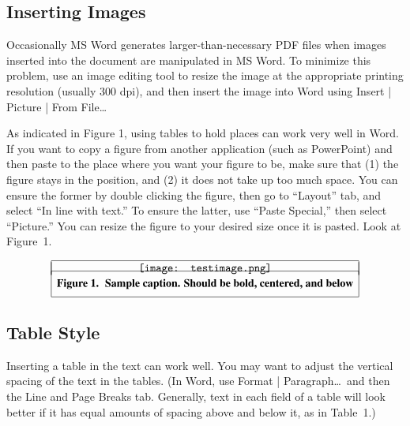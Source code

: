 \documentclass{icis}
\begin{document}
\subsection{Inserting Images}
Occasionally MS Word generates larger-than-necessary PDF files when images
inserted into the document are manipulated in MS Word. To minimize this
problem, use an image editing tool to resize the image at the appropriate
printing resolution (usually 300 dpi), and then insert the image into Word using
Insert | Picture | From File\ldots

As indicated in Figure 1, using tables to hold places can work very well in
Word. If you want to copy a figure from another application (such as PowerPoint)
and then paste to the place where you want your figure to be, make sure that (1)
the figure stays in the position, and (2) it does not take up too much
space. You can ensure the former by double clicking the figure, then go to
``Layout'' tab, and select ``In line with text.'' To ensure the latter, use ``Paste
Special,'' then select ``Picture.'' You can resize the figure to your desired size
once it is pasted. Look at Figure~1.

\vspace{-0.2cm}
\begin{figure}[h]
  \[
    \begin{array}{|c|}
      \hline                                                                                                                   \\ [-11pt]
      \texttt{[image: testimage.png]}                                                                            \\ [-4pt]
      \hline
      \addstackgap[7pt]{{\usefont{T1}{ptm}{b}{n}Figure 1.\hspace{0.09cm} Sample caption. Should be bold, centered, and below}} \\
      \hline
    \end{array}
  \]
  \caption*{}\label{fig:test} %
\end{figure}
\vspace{-0.9cm}


\subsection{Table Style}
Inserting a table in the text can work well. You may want to adjust the vertical
spacing of the text in the tables. (In Word, use Format | Paragraph\ldots~and
then the Line and Page Breaks tab. Generally, text in each field of a table will
look better if it has equal amounts of spacing above and below it, as in
Table~1.)
\end{document}
